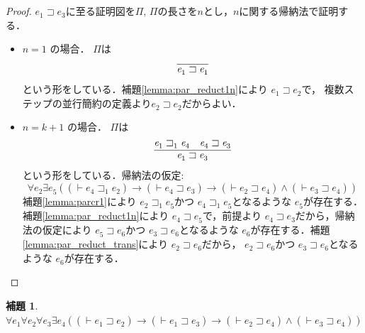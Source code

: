 \documentclass{ltjsbook}%
\newtheorem{lemma}{補題}[section]%
\newcommand\lemmaname{補題}%
\begin{document}
\begin{proof}%
  $\mathit{e}_1^{}\sqsupset\mathit{e}_3^{}$に至る証明図を$\Pi$,%
  $\Pi$の長さを$n$とし，$n$に関する帰納法で証明する．%
  \begin{itemize}%
  \item $n = 1$ の場合．%
    $\Pi$は%
    \begin{equation}%
      \infer{%
        \mathit{e}_1^{}\sqsupset\mathit{e}_1^{}%
      }{%
      }%
    \end{equation}%
    という形をしている．\lemmaname\ref{lemma:par_reduct1n}により%
    $\mathit{e}_1^{}\sqsupset\mathit{e}_2^{}$で，%
    複数ステップの並行簡約の定義より$\mathit{e}_2^{}\sqsupset\mathit{e}_2^{}$だからよい．%
  \item $n = k + 1$ の場合．%
    $\Pi$は%
    \begin{equation}%
      \infer{%
        \mathit{e}_1^{}\sqsupset\mathit{e}_3^{}%
      }{%
        \mathit{e}_1^{}\sqsupset_1^{}\mathit{e}_4^{}%
      &%
        \mathit{e}_4^{}\sqsupset\mathit{e}_3^{}%
      }%
    \end{equation}%
    という形をしている．帰納法の仮定:%
    \begin{equation}%
      \forall\mathit{e}_2^{}\exists\mathit{e}_5^{}%
      ((\vdash\mathit{e}_4^{}\sqsupset_1^{}\mathit{e}_2^{})\rightarrow%
      (\vdash\mathit{e}_4^{}\sqsupset\mathit{e}_3^{})\rightarrow%
      (\vdash\mathit{e}_2^{}\sqsupset\mathit{e}_4^{})\land%
      (\vdash\mathit{e}_3^{}\sqsupset\mathit{e}_4^{}))%
    \end{equation}%
    \lemmaname\ref{lemma:parcr1}により%
    $\mathit{e}_2^{}\sqsupset_1^{}\mathit{e}_5^{}$かつ%
    $\mathit{e}_4^{}\sqsupset_1^{}\mathit{e}_5^{}$となるような%
    $\mathit{e}_5^{}$が存在する．\lemmaname\ref{lemma:par_reduct1n}により%
    $\mathit{e}_4^{}\sqsupset\mathit{e}_5^{}$で，前提より%
    $\mathit{e}_4^{}\sqsupset\mathit{e}_3^{}$だから，帰納法の仮定により%
    $\mathit{e}_5^{}\sqsupset\mathit{e}_6^{}$かつ%
    $\mathit{e}_3^{}\sqsupset\mathit{e}_6^{}$となるような%
    $\mathit{e}_6^{}$が存在する．\lemmaname\ref{lemma:par_reduct_trans}により%
    $\mathit{e}_2^{}\sqsupset\mathit{e}_6^{}$だから，%
    $\mathit{e}_2^{}\sqsupset\mathit{e}_6^{}$かつ%
    $\mathit{e}_3^{}\sqsupset\mathit{e}_6^{}$となるような%
    $\mathit{e}_6^{}$が存在する．%
  \end{itemize}%
\end{proof}%
\begin{lemma}%
  \label{lemma:parcr}%
  $\forall\mathit{e}_1^{}\forall\mathit{e}_2^{}\forall\mathit{e}_3^{}\exists\mathit{e}_4^{}%
  ((\vdash\mathit{e}_1^{}\sqsupset\mathit{e}_2^{})\rightarrow%
  (\vdash\mathit{e}_1^{}\sqsupset\mathit{e}_3^{})\rightarrow%
  (\vdash\mathit{e}_2^{}\sqsupset\mathit{e}_4^{})\land%
  (\vdash\mathit{e}_3^{}\sqsupset\mathit{e}_4^{}))$%
\end{lemma}%
\end{document}
